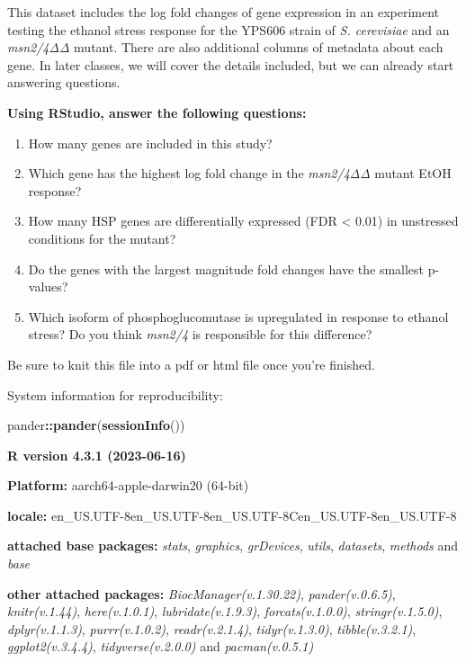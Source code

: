 \documentclass[
]{book}
\newenvironment{Shaded}{\begin{snugshade}}{\end{snugshade}}
\newcommand{\FunctionTok}[1]{\textcolor[rgb]{0.13,0.29,0.53}{\textbf{#1}}}
\newcommand{\NormalTok}[1]{#1}
\newcommand{\SpecialCharTok}[1]{\textcolor[rgb]{0.81,0.36,0.00}{\textbf{#1}}}
\begin{document}
This dataset includes the log fold changes of gene expression in an experiment testing the ethanol stress response for the YPS606 strain of \emph{S. cerevisiae} and an \emph{msn2/4ΔΔ} mutant. There are also additional columns of metadata about each gene. In later classes, we will cover the details included, but we can already start answering questions.

\textbf{Using RStudio, answer the following questions:}

\begin{enumerate}
\def\labelenumi{\arabic{enumi}.}
\item
  How many genes are included in this study?
\item
  Which gene has the highest log fold change in the \emph{msn2/4ΔΔ} mutant EtOH response?
\item
  How many HSP genes are differentially expressed (FDR \textless{} 0.01) in unstressed conditions for the mutant?
\item
  Do the genes with the largest magnitude fold changes have the smallest p-values?
\item
  Which isoform of phosphoglucomutase is upregulated in response to ethanol stress? Do you think \emph{msn2/4} is responsible for this difference?
\end{enumerate}

Be sure to knit this file into a pdf or html file once you're finished.

System information for reproducibility:

\begin{Shaded}
\begin{Highlighting}[]
\NormalTok{pander}\SpecialCharTok{::}\FunctionTok{pander}\NormalTok{(}\FunctionTok{sessionInfo}\NormalTok{())}
\end{Highlighting}
\end{Shaded}

\textbf{R version 4.3.1 (2023-06-16)}

\textbf{Platform:} aarch64-apple-darwin20 (64-bit)

\textbf{locale:}
en\_US.UTF-8\textbar\textbar en\_US.UTF-8\textbar\textbar en\_US.UTF-8\textbar\textbar C\textbar\textbar en\_US.UTF-8\textbar\textbar en\_US.UTF-8

\textbf{attached base packages:}
\emph{stats}, \emph{graphics}, \emph{grDevices}, \emph{utils}, \emph{datasets}, \emph{methods} and \emph{base}

\textbf{other attached packages:}
\emph{BiocManager(v.1.30.22)}, \emph{pander(v.0.6.5)}, \emph{knitr(v.1.44)}, \emph{here(v.1.0.1)}, \emph{lubridate(v.1.9.3)}, \emph{forcats(v.1.0.0)}, \emph{stringr(v.1.5.0)}, \emph{dplyr(v.1.1.3)}, \emph{purrr(v.1.0.2)}, \emph{readr(v.2.1.4)}, \emph{tidyr(v.1.3.0)}, \emph{tibble(v.3.2.1)}, \emph{ggplot2(v.3.4.4)}, \emph{tidyverse(v.2.0.0)} and \emph{pacman(v.0.5.1)}
\end{document}
